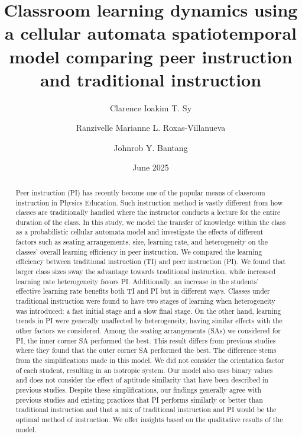 \documentclass[twocolumn,secnumarabic,amssymb, nobibnotes, aps, prd]{revtex4-2}
\begin{document}
\title{Classroom learning dynamics using a cellular automata spatiotemporal model comparing peer instruction and traditional instruction}%

\author{Clarence Ioakim T. Sy}%
%

\author{Ranzivelle Marianne L. Roxas-Villanueva}%
%

\author{Johnrob Y. Bantang}%
%

\date{June 2025}%

\begin{abstract}
    Peer instruction (PI) has recently become one of the popular means of classroom instruction in Physics Education.
    Such instruction method is vastly different from how classes are traditionally handled where the instructor conducts a lecture for the entire duration of the class.
    In this study, we model the transfer of knowledge within the class as a probabilistic cellular automata model and investigate the effects of different factors such as seating arrangements, size, learning rate, and heterogeneity on the classes' overall learning efficiency in peer instruction.
    We compared the learning efficiency between traditional instruction (TI) and peer instruction (PI). 
    We found that larger class sizes sway the advantage towards traditional instruction, while increased learning rate heterogeneity favors PI.
    Additionally, an increase in the students' effective learning rate benefits both TI and PI but in different ways.
    Classes under traditional instruction were found to have two stages of learning when heterogeneity was introduced: a fast initial stage and a slow final stage.
    On the other hand, learning trends in PI were generally unaffected by heterogeneity, having similar effects with the other factors we considered.
    Among the seating arrangements (SAs) we considered for PI, the inner corner SA performed the best.
    This result differs from previous studies where they found that the outer corner SA performed the best.
    The difference stems from the simplifications made in this model.
    We did not consider the orientation factor of each student, resulting in an isotropic system.
    Our model also uses binary values and does not consider the effect of aptitude similarity that have been described in previous studies. 
    Despite these simplifications, our findings generally agree with previous studies and existing practices that PI performs similarly or better than traditional instruction and that a mix of traditional instruction and PI would be the optimal method of instruction.
    We offer insights based on the qualitative results of the model.
\end{abstract}
\end{document}

